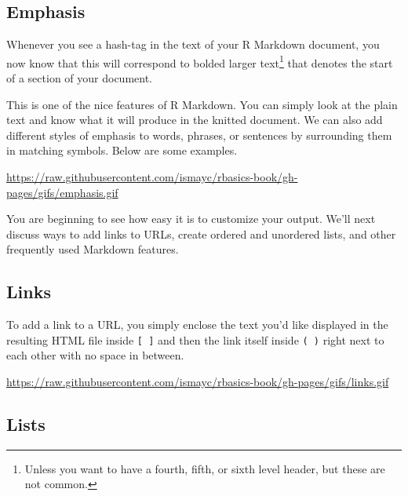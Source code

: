 \documentclass[]{tufte-book}
\theoremstyle{definition}
\theoremstyle{definition}
\theoremstyle{remark}
\begin{document}
\subsection{Emphasis}\label{emphasis}

Whenever you see a hash-tag in the text of your R Markdown document, you
now know that this will correspond to bolded larger text\footnote{Unless
  you want to have a fourth, fifth, or sixth level header, but these are
  not common.} that denotes the start of a section of your document.

This is one of the nice features of R Markdown. You can simply look at
the plain text and know what it will produce in the knitted document. We
can also add different styles of emphasis to words, phrases, or
sentences by surrounding them in matching symbols. Below are some
examples.

\vspace{0.1in}

\begin{center}\footnotesize{\url{https://raw.githubusercontent.com/ismayc/rbasics-book/gh-pages/gifs/emphasis.gif}}\end{center}

\vspace{0.1in}

You are beginning to see how easy it is to customize your output. We'll
next discuss ways to add links to URLs, create ordered and unordered
lists, and other frequently used Markdown features.

\subsection{Links}\label{links}

To add a link to a URL, you simply enclose the text you'd like displayed
in the resulting HTML file inside \texttt{{[}\ {]}} and then the link
itself inside \texttt{(\ )} right next to each other with no space in
between.

\vspace{0.1in}

\begin{center}\footnotesize{\url{https://raw.githubusercontent.com/ismayc/rbasics-book/gh-pages/gifs/links.gif}}\end{center}

\vspace{0.1in}

\subsection{Lists}\label{lists}
\end{document}
